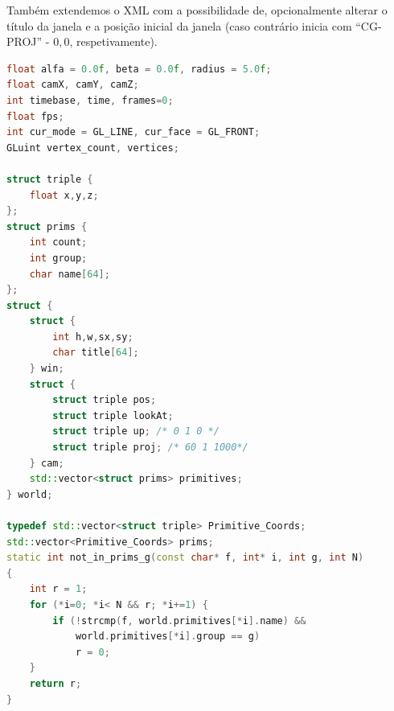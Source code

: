 \documentclass[14pt, a4 paper]{article}
\begin{document}
Tamb\'em extendemos o XML com a possibilidade de, opcionalmente alterar o título da janela e a posição
inicial da janela (caso contr\'ario inicia com ``CG-PROJ'' - $0,0$, respetivamente).
\begin{lstlisting}[language = c++]
float alfa = 0.0f, beta = 0.0f, radius = 5.0f;
float camX, camY, camZ;
int timebase, time, frames=0;
float fps;
int cur_mode = GL_LINE, cur_face = GL_FRONT;
GLuint vertex_count, vertices;

struct triple {
	float x,y,z;
};
struct prims {
	int count;
	int group;
	char name[64];
};
struct {
	struct {
		int h,w,sx,sy;
		char title[64];
	} win;
	struct {
		struct triple pos;
		struct triple lookAt;
		struct triple up; /* 0 1 0 */
		struct triple proj; /* 60 1 1000*/
	} cam;
	std::vector<struct prims> primitives;
} world;

typedef std::vector<struct triple> Primitive_Coords;
std::vector<Primitive_Coords> prims;
static int not_in_prims_g(const char* f, int* i, int g, int N)
{
	int r = 1;
	for (*i=0; *i< N && r; *i+=1) {
		if (!strcmp(f, world.primitives[*i].name) &&
		    world.primitives[*i].group == g)
		    r = 0;
	}
	return r;
}

\end{lstlisting}
\end{document}
